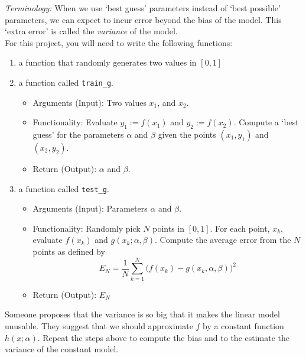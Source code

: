 \noindent\textit{Terminology:} When we use `best guess' parameters instead of `best possible' parameters, we can expect to incur error beyond the bias of the model. This `extra error' is called the \textit{variance} of the model.  \\
\vspace*{1cm}	
\noindent For this project, you will need to write the following functions:
\begin{enumerate}
    \item a function that randomly generates two values in $[0,1]$
    \item a function called \texttt{train\_g}.
    \begin{itemize}
        \item Arguments (Input): Two values $x_1$, and $x_2$.
        \item Functionality: Evaluate $y_1:=f(x_1)$ and $y_2:= f(x_2)$. Compute a `best guess' for the parameters $ \alpha$ and $ \beta$ given the points $(x_1,y_1)$ and $(x_2,y_2)$.
        \item Return (Output): $ \alpha$ and $ \beta$.
    \end{itemize}
    \item a function called \texttt{test\_g}.
    \begin{itemize}
        \item Arguments (Input): Parameters $ \alpha$ and $ \beta$.
        \item Functionality: Randomly pick $N$ points in $[0,1]$. For each point, $x_k$, evaluate $f(x_k)$ and $g(x_k;  \alpha,  \beta)$. Compute the average error from the $N$ points as defined by $$E_N = \frac{1}{N}\sum_{k = 1}^N \Big(f(x_k) - g(x_k, \alpha, \beta)\Big)^2$$
        \item Return (Output): $E_N$   
    \end{itemize}
\end{enumerate}

Someone proposes that the variance is so big that it makes the linear model unusable.  They suggest that we should approximate $f$ by a constant function  $h(x;\alpha)$. Repeat the steps above to compute the bias and to the estimate the variance of the constant model. 
